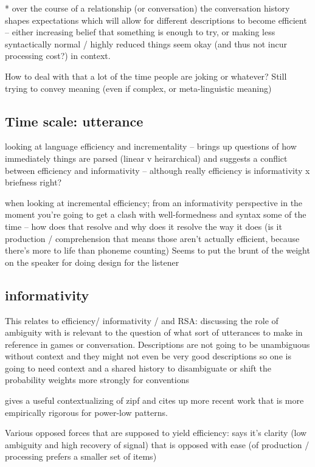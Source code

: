 \documentclass[]{article}
\begin{document}
* over the course of a relationship (or conversation) the conversation history shapes expectations which will allow for different descriptions to become efficient -- either increasing belief that something is enough to try, or making less syntactically normal / highly reduced things seem okay (and thus not incur processing cost?) in context. 

How to deal with that a lot of the time people are joking or whatever? Still trying to convey meaning (even if complex, or meta-linguistic meaning)

\subsection{Time scale: utterance} 
\cite{rubio-fernandez2021} looking at language efficiency and incrementality -- brings up questions of how immediately things are parsed (linear v heirarchical) and suggests a conflict between efficiency and informativity -- although really efficiency is informativity x briefness right? 

\cite{rubio-fernandez2021} when looking at incremental efficiency; from an informativity perspective in the moment you're going to get a clash with well-formedness and syntax some of the time -- how does that resolve and why does it resolve the way it does (is it production / comprehension that means those aren't actually efficient, because there's more to life than phoneme counting) Seems to put the brunt of the weight on the speaker for doing design for the listener 


\subsection{informativity}

This relates to efficiency/ informativity / and RSA: \cite{piantadosi2012} discussing the role of ambiguity with is relevant to the question of what sort of utterances to make in reference in games or conversation. Descriptions are not going to be unambiguous without context and they might not even be very good descriptions so one is going to need context and a shared history to disambiguate or shift the probability weights more strongly for conventions

\cite{piantadosi2012} gives a useful contextualizing of zipf and cites up more recent work that is more empirically rigorous for power-low patterns. 

Various opposed forces that are supposed to yield efficiency: \cite{piantadosi2012} says it's clarity (low ambiguity and high recovery of signal) that is opposed with ease (of production / processing prefers a smaller set of items) 
\end{document}
